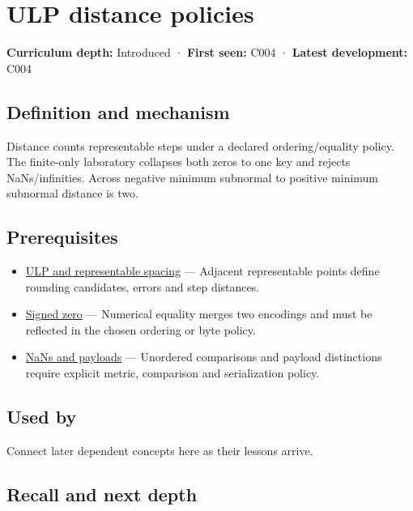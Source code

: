 \hypertarget{appendix-deca299ae4b8}{}\label{referencestart:appendix-deca299ae4b8}
\section{ULP distance policies}\label{appendix-deca299ae4b8-ulp-distance-policies}

\textbf{Curriculum depth:} Introduced · \textbf{First seen:} C004 · \textbf{Latest development:} C004

\subsection{Definition and mechanism}\label{appendix-deca299ae4b8-definition-and-mechanism}

Distance counts representable steps under a declared ordering/equality policy. The finite-only laboratory collapses both zeros to one key and rejects NaNs/infinities. Across negative minimum subnormal to positive minimum subnormal distance is two.

\subsection{Prerequisites}\label{appendix-deca299ae4b8-prerequisites}

\begin{itemize}
\tightlist
\item
  \hyperref[appendix-14bab4cab9d4]{ULP and representable spacing} --- Adjacent representable points define rounding candidates, errors and step distances.
\item
  \hyperref[appendix-3a048f032c1f]{Signed zero} --- Numerical equality merges two encodings and must be reflected in the chosen ordering or byte policy.
\item
  \hyperref[appendix-d6607cc4c235]{NaNs and payloads} --- Unordered comparisons and payload distinctions require explicit metric, comparison and serialization policy.
\end{itemize}

\subsection{Used by}\label{appendix-deca299ae4b8-used-by}

Connect later dependent concepts here as their lessons arrive.

\subsection{Recall and next depth}\label{appendix-deca299ae4b8-recall-and-next-depth}

